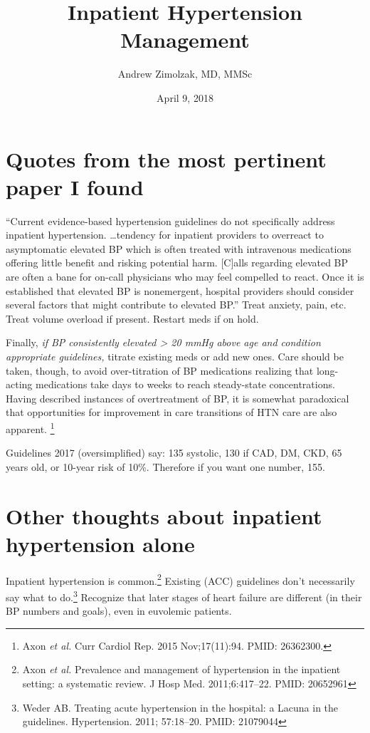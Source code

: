 \documentclass{tufte-handout}
\title{Inpatient Hypertension Management}
\author{Andrew Zimolzak, MD, MMSc}
\date{April 9, 2018}
\begin{document}
\maketitle


\section{Quotes from the most pertinent paper I found}

``Current evidence-based hypertension guidelines do not specifically
address inpatient hypertension. \ldots{}tendency for inpatient
providers to overreact to asymptomatic elevated BP which is often
treated with intravenous medications offering little benefit and
risking potential harm. [C]alls regarding elevated BP are often a bane
for on-call physicians who may feel compelled to react. Once it is
established that elevated BP is nonemergent, hospital providers should
consider several factors that might contribute to elevated BP.'' Treat
anxiety, pain, etc. Treat volume overload if present. Restart meds if
on hold.

Finally, \emph{if BP consistently elevated > 20 mmHg above age and
  condition appropriate guidelines,} titrate existing meds or add new
ones. Care should be taken, though, to avoid over-titration of BP
medications realizing that long-acting medications take days to weeks
to reach steady-state concentrations. Having described instances of
overtreatment of BP, it is somewhat paradoxical that opportunities for
improvement in care transitions of HTN care are also
apparent. \footnote{Axon \emph{et al.} Curr Cardiol Rep. 2015 Nov;17(11):94.
  PMID: 26362300.}

Guidelines 2017 (oversimplified) say: 135 systolic, 130 if CAD, DM,
CKD, 65 years old, or 10-year risk of 10\%. Therefore if you want one
number, 155.

\section{Other thoughts about inpatient hypertension alone}

Inpatient hypertension is common.\footnote{Axon \emph{et al.}
  Prevalence and management of hypertension in the inpatient setting:
  a systematic review. J Hosp Med. 2011;6:417--22. PMID: 20652961}
Existing (ACC) guidelines don't necessarily say what to do.\footnote{Weder
  AB. Treating acute hypertension in the hospital: a Lacuna in the
  guidelines. Hypertension. 2011; 57:18--20. PMID: 21079044} Recognize
that later stages of heart failure are different (in their BP numbers
and goals), even in euvolemic patients.
\end{document}

